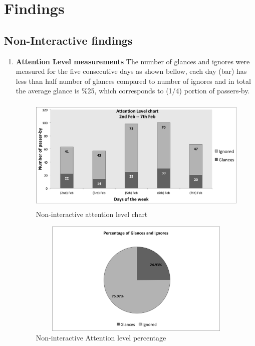 \newpage
\section{Findings}


\subsection{Non-Interactive findings}



\begin{enumerate}

\item \textbf{Attention Level measurements} 
The number of glances and ignores were measured for the five consecutive days as shown bellow, each day (bar) has less than half number of glances compared to number of ignores and in total the average glance is \%25, which corresponds to (1/4) portion of passers-by.


\begin{figure}[H]
    \centering
    \includegraphics[width=110mm,height=55mm]{Figures/8/non_inter_findings/Non_Inter_chart}%
    \caption{Non-interactive attention level chart}%
    \label{fig:Nonattentionlevelchart}%
\end{figure}


\begin{figure}[H]
    \centering
    \includegraphics[width=110mm,height=55mm]{Figures/8/non_inter_findings/non_inter_percentage}
    \caption{Non-interactive Attention level percentage}%
    \label{fig:Nonattentionlevelpercentage}%
\end{figure}




\end{enumerate}
